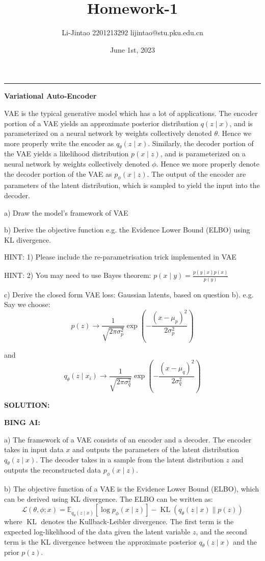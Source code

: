 \documentclass{homework}
\author{Li-Jintao 2201213292 lijintao@stu.pku.edu.cn}
\date{June 1st, 2023}
\title{\Large \textbf{Homework-1}}
\begin{document}
 \maketitle
\rule[0ex]{\textwidth}{1.5pt}
\begin{shaded}
\question \textbf{Variational Auto-Encoder}
    
VAE is the typical generative model which has a lot of applications. The encoder portion of a VAE yields an approximate posterior distribution $q(z \mid x)$, and is parameterized on a neural network by weights collectively denoted $\theta$. Hence we more properly write the encoder as $q_{\theta}(z \mid x)$. Similarly, the decoder portion of the VAE yields a likelihood distribution $p(x \mid z)$, and is parameterized on a neural network by weights collectively denoted $\phi$. Hence we more properly denote the decoder portion of the VAE as $p_{\phi}(x \mid z)$. The output of the encoder are parameters of the latent distribution, which is sampled to yield the input into the decoder.

a) Draw the model's framework of VAE

b) Derive the objective function e.g. the Evidence Lower Bound (ELBO) using KL divergence.

HINT: 1) Please include the re-parametrisation trick implemented in VAE

HINT: 2) You may need to use Bayes theorem: $p(x \mid y)=\frac{p(y \mid x) p(x)}{p(y)}$ 

c) Derive the closed form VAE loss: Gaussian latents, based on question b). e.g. Say we choose:
$$
p(z) \rightarrow \frac{1}{\sqrt{2 \pi \sigma_{p}^{2}}} \exp \left(-\frac{\left(x-\mu_{p}\right)^{2}}{2 \sigma_{p}^{2}}\right)
$$

and
$$
q_{\theta}\left(z \mid x_{i}\right) \rightarrow \frac{1}{\sqrt{2 \pi \sigma_{q}^{2}}} \exp \left(-\frac{\left(x-\mu_{q}\right)^{2}}{2 \sigma_{q}^{2}}\right)
$$
    
\end{shaded}
\textbf{SOLUTION:}

\textbf{BING AI:}

a) The framework of a VAE consists of an encoder and a decoder. The encoder takes in input data $x$ and outputs the parameters of the latent distribution $q_{\theta}(z \mid x)$. The decoder takes in a sample from the latent distribution $z$ and outputs the reconstructed data $p_{\phi}(x \mid z)$.

b) The objective function of a VAE is the Evidence Lower Bound (ELBO), which can be derived using KL divergence. The ELBO can be written as:
$$
\mathcal{L}(\theta, \phi ; x)=\mathbb{E}_{q_{\theta}(z \mid x)}[\log p_{\phi}(x \mid z)]-\operatorname{KL}\left(q_{\theta}(z \mid x) \| p(z)\right)
$$
where $\operatorname{KL}$ denotes the Kullback-Leibler divergence. The first term is the expected log-likelihood of the data given the latent variable $z$, and the second term is the KL divergence between the approximate posterior $q_{\theta}(z \mid x)$ and the prior $p(z)$.
\end{document}

